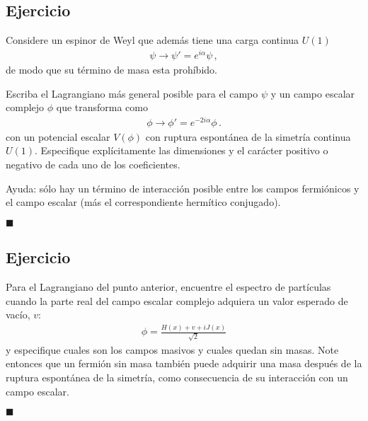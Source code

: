 \subsection*{Ejercicio}

Considere un espinor de Weyl que además tiene una carga continua $U(1)$
  \begin{align}
    \psi\to \psi'=e^{i\alpha}\psi\,,
  \end{align}
de modo que su término de masa esta prohíbido.

Escriba el Lagrangiano más general posible para el campo $\psi$ y un campo escalar complejo $\phi$ que transforma como
\begin{align}
  \phi\to \phi'=e^{-2i\alpha}\phi\,.
\end{align}
con un potencial escalar $V(\phi)$ con ruptura espontánea de la simetría continua $U(1)$. Especifique explícitamente las dimensiones y el carácter positivo o negativo de cada uno de los coeficientes. 

Ayuda: sólo hay un término de interacción posible entre los campos fermiónicos y el campo escalar (más el correspondiente hermítico conjugado).

\hrulefill{}$\blacksquare$

\subsection{Ejercicio}

Para el Lagrangiano del punto anterior, encuentre el espectro de partículas cuando la parte real del campo escalar complejo adquiera un valor esperado de vacío, $v$:
  \begin{align*}
    \phi=\frac{H(x)+v+i J(x)}{\sqrt{2}}
  \end{align*}
y especifique cuales son los campos masivos y cuales quedan sin masas. Note entonces que un fermión sin masa también puede adquirir una masa después de la ruptura espontánea de la simetría, como consecuencia de su interacción con un campo escalar.
\label{item:ssb}

\hrulefill{}$\blacksquare$


